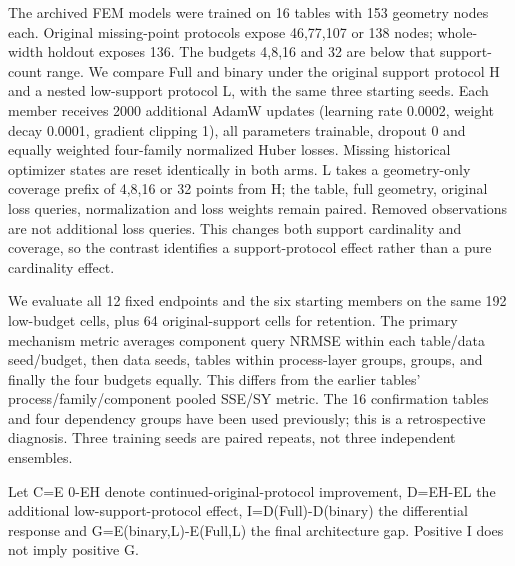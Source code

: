 \documentclass[10pt,twocolumn]{article}
\begin{document}
The archived FEM models were trained on 16 tables with 153 geometry nodes each. Original missing-point protocols expose 46,77,107 or 138 nodes; whole-width holdout exposes 136. The budgets 4,8,16 and 32 are below that support-count range. We compare Full and binary under the original support protocol H and a nested low-support protocol L, with the same three starting seeds. Each member receives 2000 additional AdamW updates (learning rate 0.0002, weight decay 0.0001, gradient clipping 1), all parameters trainable, dropout 0 and equally weighted four-family normalized Huber losses. Missing historical optimizer states are reset identically in both arms. L takes a geometry-only coverage prefix of 4,8,16 or 32 points from H; the table, full geometry, original loss queries, normalization and loss weights remain paired. Removed observations are not additional loss queries. This changes both support cardinality and coverage, so the contrast identifies a support-protocol effect rather than a pure cardinality effect.

We evaluate all 12 fixed endpoints and the six starting members on the same 192 low-budget cells, plus 64 original-support cells for retention. The primary mechanism metric averages component query NRMSE within each table/data seed/budget, then data seeds, tables within process-layer groups, groups, and finally the four budgets equally. This differs from the earlier tables' process/family/component pooled SSE/SY metric. The 16 confirmation tables and four dependency groups have been used previously; this is a retrospective diagnosis. Three training seeds are paired repeats, not three independent ensembles.

Let C=E 0-EH denote continued-original-protocol improvement, D=EH-EL the additional low-support-protocol effect, I=D(Full)-D(binary) the differential response and G=E(binary,L)-E(Full,L) the final architecture gap. Positive I does not imply positive G.

\begin{table}[t]\centering\scriptsize{}\caption{Paired support-protocol effects for each source-training seed; table/group primary NRMSE.}\end{table}
\end{document}
